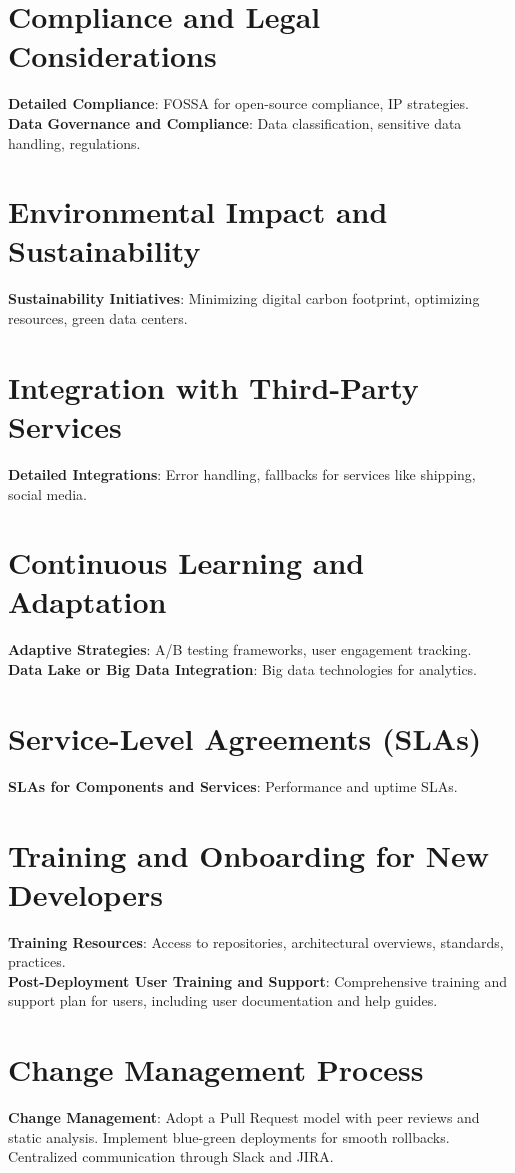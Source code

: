 \documentclass[a4paper,12pt]{article}
\begin{document}
	\section*{Compliance and Legal Considerations}
	\textbf{Detailed Compliance}: FOSSA for open-source compliance, IP strategies. \\
	\textbf{Data Governance and Compliance}: Data classification, sensitive data handling, regulations.
	
	\section*{Environmental Impact and Sustainability}
	\textbf{Sustainability Initiatives}: Minimizing digital carbon footprint, optimizing resources, green data centers.
	
	\section*{Integration with Third-Party Services}
	\textbf{Detailed Integrations}: Error handling, fallbacks for services like shipping, social media.
	
	\section*{Continuous Learning and Adaptation}
	\textbf{Adaptive Strategies}: A/B testing frameworks, user engagement tracking. \\
	\textbf{Data Lake or Big Data Integration}: Big data technologies for analytics.
	
	\section*{Service-Level Agreements (SLAs)}
	\textbf{SLAs for Components and Services}: Performance and uptime SLAs.
	
	\section*{Training and Onboarding for New Developers}
	\textbf{Training Resources}: Access to repositories, architectural overviews, standards, practices. \\
	\textbf{Post-Deployment User Training and Support}: Comprehensive training and support plan for users, including user documentation and help guides.
	
	\section*{Change Management Process}
	\textbf{Change Management}: Adopt a Pull Request model with peer reviews and static analysis. Implement blue-green deployments for smooth rollbacks. Centralized communication through Slack and JIRA.
	
\end{document}
